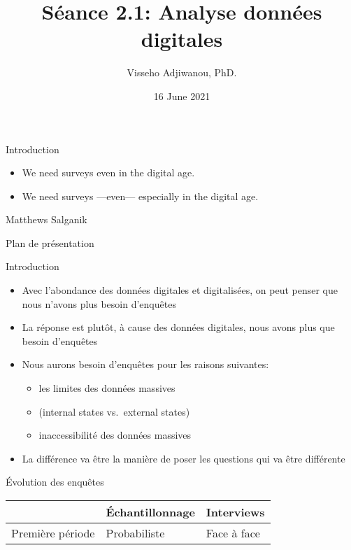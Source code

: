 \documentclass[
  ignorenonframetext,
]{beamer}
\title{Séance 2.1: Analyse données digitales}
\author{Visseho Adjiwanou, PhD.}
\date{16 June 2021}
\institute{SICSS - Montréal}
\providecommand{\tightlist}{%
  \setlength{\itemsep}{0pt}\setlength{\parskip}{0pt}}
\begin{document}
\frame{\titlepage}

\begin{frame}{Introduction}
\protect\hypertarget{introduction}{}

\begin{itemize}[<+->]
\tightlist
\item
  We need surveys even in the digital age.
\item
  We need surveys ---even--- especially in the digital age.
\end{itemize}

Matthews Salganik

\end{frame}

\begin{frame}{Plan de présentation}
\protect\hypertarget{plan-de-pruxe9sentation}{}

\end{frame}

\begin{frame}{Introduction}
\protect\hypertarget{introduction-1}{}

\begin{itemize}
\item
  Avec l'abondance des données digitales et digitalisées, on peut penser
  que nous n'avons plus besoin d'enquêtes
\item
  La réponse est plutôt, à cause des données digitales, nous avons plus
  que besoin d'enquêtes
\item
  Nous aurons besoin d'enquêtes pour les raisons suivantes:

  \begin{itemize}
  \tightlist
  \item
    les limites des données massives
  \item
    (internal states vs.~external states)
  \item
    inaccessibilité des données massives
  \end{itemize}
\item
  La différence va être la manière de poser les questions qui va être
  différente
\end{itemize}

\end{frame}

\begin{frame}{Évolution des enquêtes}
\protect\hypertarget{uxe9volution-des-enquuxeates}{}

\begin{longtable}[]{@{}lll@{}}
\toprule
& Échantillonnage & Interviews\tabularnewline
\midrule
\endhead
Première période & Probabiliste & Face à face\tabularnewline
\bottomrule
\end{longtable}

\end{frame}
\end{document}

